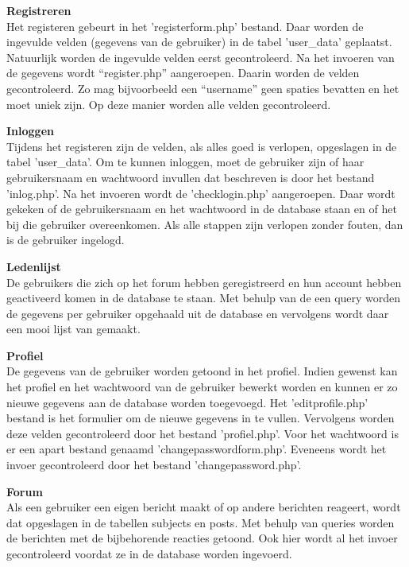 \documentclass[a4paper,12pt]{article}
\begin{document}
{\bfseries Registreren} \\
Het registeren gebeurt in het 'registerform.php' bestand. Daar worden de ingevulde velden (gegevens van de gebruiker) in de tabel 'user\_data' geplaatst. Natuurlijk worden de ingevulde velden eerst gecontroleerd. Na het invoeren van de gegevens wordt “register.php” aangeroepen. Daarin worden de velden gecontroleerd. Zo mag bijvoorbeeld een “username” geen spaties bevatten en het moet uniek zijn. Op deze manier worden alle velden gecontroleerd. 

{\bfseries Inloggen}\\
Tijdens het registeren zijn de velden, als alles goed is verlopen, opgeslagen in de tabel 'user\_data'. Om te kunnen inloggen, moet de gebruiker zijn of haar gebruikersnaam en wachtwoord invullen dat beschreven is door het bestand 'inlog.php'. Na het invoeren wordt de 'checklogin.php' aangeroepen. Daar wordt gekeken of de gebruikersnaam en het wachtwoord in de database staan en of het bij die gebruiker overeenkomen. Als alle stappen zijn verlopen zonder fouten, dan is de gebruiker ingelogd.

{\bfseries Ledenlijst}\\
De gebruikers die zich op het forum hebben geregistreerd en hun account hebben geactiveerd komen in de database te staan. Met behulp van de een query worden de gegevens per gebruiker opgehaald uit de database en vervolgens wordt daar een mooi lijst van gemaakt. 

{\bfseries Profiel}\\
De gegevens van de gebruiker worden getoond in het profiel. Indien gewenst kan het profiel en het wachtwoord van de gebruiker bewerkt worden en kunnen er zo nieuwe gegevens aan de database worden toegevoegd. Het 'editprofile.php' bestand is het formulier om de nieuwe gegevens in te vullen. Vervolgens worden deze velden gecontroleerd door het bestand 'profiel.php'. Voor het wachtwoord is er een apart bestand genaamd 'changepasswordform.php'. Eveneens wordt het invoer gecontroleerd door het bestand 'changepassword.php'. 

{\bfseries Forum}\\
Als een gebruiker een eigen bericht maakt of op andere berichten reageert, wordt dat opgeslagen in de tabellen subjects en posts. Met behulp van queries worden de berichten met de bijbehorende reacties getoond. Ook hier wordt al het invoer gecontroleerd voordat ze in de database worden ingevoerd.\\
\end{document}
